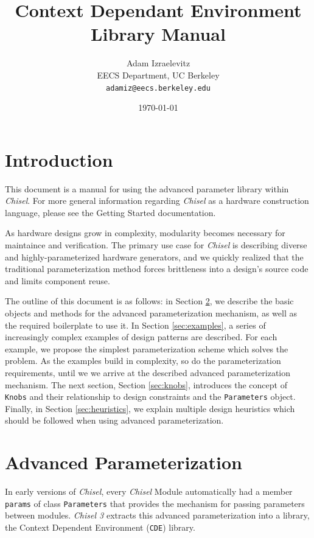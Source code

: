 \documentclass[10pt,twocolumn]{article}
\title{Context Dependant Environment Library Manual}
\author{Adam Izraelevitz \\
EECS Department, UC Berkeley\\
{\tt  adamiz@eecs.berkeley.edu}
}
\date{\today}
\def\code#1{{\small\tt #1}}
\begin{document}
\maketitle{}


\section{Introduction}

This document is a manual for using the advanced parameter library within {\em Chisel}. For more general information regarding {\em Chisel} as a hardware construction language, please see the Getting Started documentation.

As hardware designs grow in complexity, modularity becomes necessary for maintaince and verification. The primary use case for {\em Chisel} is describing diverse and highly-parameterized hardware generators, and we quickly realized that the traditional parameterization method forces brittleness into a design's source code and limits component reuse.

The outline of this document is as follows: in Section \ref{sec:advanced}, we describe the basic objects and methods for the advanced parameterization mechanism, as well as the required boilerplate to use it. In Section \ref{sec:examples}, a series of increasingly complex examples of design patterns are described. For each example, we propose the simplest parameterization scheme which solves the problem. As the examples build in complexity, so do the parameterization requirements, until we we arrive at the described advanced parameterization mechanism. The next section, Section \ref{sec:knobs}, introduces the concept of \code{Knobs} and their relationship to design constraints and the \code{Parameters} object. Finally, in Section \ref{sec:heuristics}, we explain multiple design heuristics which should be followed when using advanced parameterization.

\section{Advanced Parameterization}
\label{sec:advanced}
	
In early versions of {\em Chisel}, every {\em Chisel} Module automatically
had a member \code{params} of class \code{Parameters} that provides the mechanism for passing
parameters between modules. {\em Chisel 3} extracts this advanced parameterization into a library,
the Context Dependent Environment (\code{CDE}) library.
\end{document}
